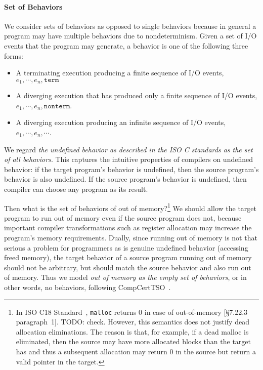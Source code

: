 \paragraph{Set of Behaviors}

We consider sets of behaviors as opposed to single behaviors because in general a program may have
multiple behaviors due to nondeterminism.  Given a set of I/O events that the program may generate,
a behavior is one of the following three forms:
\begin{itemize}
\item A terminating execution producing a finite sequence of I/O events,
  $e_1, \cdots, e_n, \mathtt{term}$
\item A diverging execution that has produced only a finite sequence of I/O events,
  $e_1, \cdots, e_n, \mathtt{nonterm}$.
\item A diverging execution producing an infinite sequence of I/O events,
  $e_1, \cdots, e_n, \cdots$.
\end{itemize}

We regard \emph{the undefined behavior as described in the ISO C standards as the set of all
  behaviors}.  This captures the intuitive properties of compilers on undefined behavior: if the
target program's behavior is undefined, then the source program's behavior is also undefined.  If
the source program's behavior is undefined, then compiler can choose any program as its result.

Then what is the set of behaviors of out of memory?\footnote{In ISO C18 Standard~\cite{iso2018iec},
  \texttt{malloc} returns $0$ in case of out-of-memory [\S7.22.3 paragraph~1].  TODO: check.
  However, this semantics does not justify dead allocation eliminations.  The reason is that, for
  example, if a dead malloc is eliminated, then the source may have more allocated blocks than the
  target has and thus a subsequent allocation may return 0 in the source but return a valid pointer
  in the target.}
We should allow the target program to run out of memory even if the source program does not, because
important compiler transformations such as register allocation may increase the program's memory
requirements.  Dually, since running out of memory is not that serious a problem for programmers as
is genuine undefined behavior (\eg accessing freed memory), the target behavior of a source program
running out of memory should not be arbitrary, but should match the source behavior and also run out
of memory.  Thus we model \emph{out of memory as the empty set of behaviors}, or in other words, no
behaviors, following CompCertTSO~\cite{vsevvcik2013compcerttso}.

